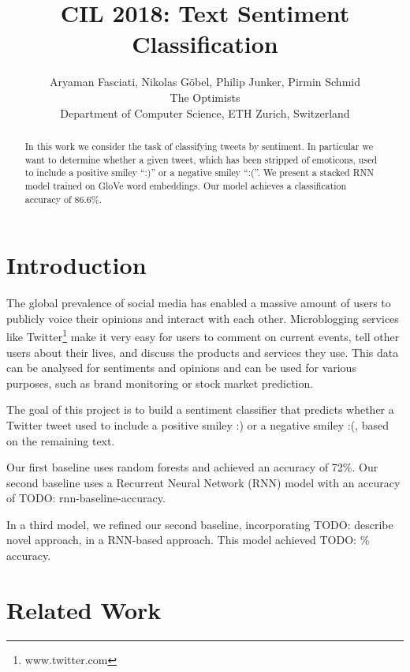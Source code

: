 \documentclass[10pt,conference,compsocconf]{IEEEtran}
\newcommand{\todo}[1]{}
\renewcommand{\todo}[1]{{\color{red} TODO: {#1}}}
\begin{document}
\title{CIL 2018: Text Sentiment Classification}

\author{
  Aryaman Fasciati, Nikolas G\"obel, Philip Junker, Pirmin Schmid\\
  The Optimists\\
  Department of Computer Science, ETH Zurich, Switzerland
}

\maketitle

\begin{abstract}
  In this work we consider the task of classifying tweets by
  sentiment. In particular we want to determine whether a given tweet,
  which has been stripped of emoticons, used to include a positive
  smiley ``:)'' or a negative smiley ``:(''. We present a stacked RNN
  model trained on GloVe word embeddings. Our model achieves a
  classification accuracy of 86.6\%.
\end{abstract}


\section{Introduction}
The global prevalence of social media has enabled a massive amount of users
to publicly voice their opinions and interact with each other.
Microblogging services like Twitter\footnote{www.twitter.com} make it
very easy for users to comment on current events, tell other users about their
lives, and discuss the products and services they use.
This data can be analysed for sentiments and opinions and can be used for
various purposes, such as brand monitoring or stock market prediction.

The goal of this project is to build a sentiment classifier that
predicts whether a Twitter tweet used to include a positive smiley :) or
a negative smiley :(, based on the remaining text.

Our first baseline uses random forests and achieved an accuracy of
72\%. Our second baseline uses a Recurrent Neural Network (RNN) model
with an accuracy of \todo{rnn-baseline-accuracy}.

In a third model, we refined our second baseline, incorporating
\todo{describe novel approach}, in a RNN-based approach. This model
achieved \todo{\%} accuracy.


\section{Related Work}
\end{document}
